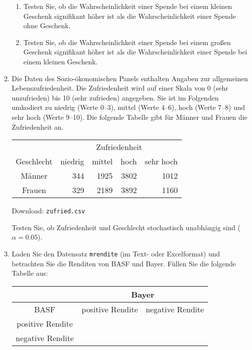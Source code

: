 \begin{enumerate}
\begin{enumerate}
\item Testen Sie, ob die Wahrscheinlichkeit einer Spende bei einem kleinen
Geschenk signifikant h\"{o}her ist als die Wahrscheinlichkeit einer Spende
ohne Geschenk.

\item Testen Sie, ob die Wahrscheinlichkeit einer Spende bei einem gro\ss en
Geschenk signifikant h\"{o}her ist als die Wahrscheinlichkeit einer Spende
bei einem kleinen Geschenk.
\end{enumerate}

\item Die Daten des Sozio-\"{o}konomischen Panels enthalten Angaben zur
allgemeinen Lebenszufriedenheit. Die Zufriedenheit wird auf einer Skala von
0 (sehr unzufrieden) bis 10 (sehr zufrieden) angegeben. Sie ist im Folgenden
umkodiert zu niedrig (Werte 0--3), mittel (Werte 4--6), hoch (Werte 7--8)
und sehr hoch (Werte 9--10). Die folgende Tabelle gibt f\"{u}r M\"{a}nner
und Frauen die Zufriedenheit an.

\begin{center}%
\begin{tabular}{|c|rrrr|}
\hline
& \multicolumn{4}{|c|}{Zufriedenheit} \\ \cline{2-5}
Geschlecht & niedrig & mittel & hoch & sehr hoch \\ \hline
M\"{a}nner & 344 & 1925 & 3802 & 1012 \\ 
Frauen & 329 & 2189 & 3892 & 1160 \\ \hline
\end{tabular}

Download: \texttt{zufried.csv}%
\end{center}%

Testen Sie, ob Zufriedenheit und Geschlecht stochastisch unabh\"{a}ngig sind
($\alpha =0.05$).

\item Laden Sie den Datensatz \texttt{mrendite} (im Text- oder Excelformat)
und betrachten Sie die Renditen von BASF und Bayer. F\"{u}llen Sie die
folgende Tabelle aus:

\begin{center}%
\begin{tabular}{|c||c|c|}
\hline
& \multicolumn{2}{|c|}{Bayer} \\ \hline
BASF & positive Rendite & negative Rendite \\ \hline\hline
positive Rendite &  &  \\ \hline
negative Rendite &  &  \\ \hline
\end{tabular}
\end{center}%


\end{enumerate}
